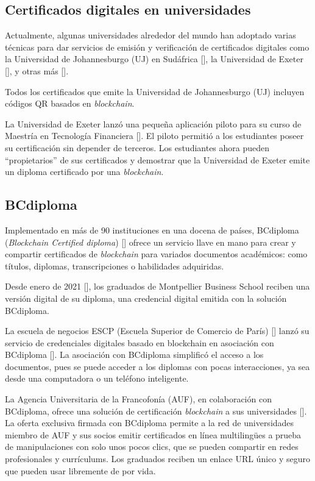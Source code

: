 \subsection{Certificados digitales en universidades}
Actualmente, algunas universidades alrededor del mundo han adoptado varias técnicas para dar servicios de emisión  y verificación de certificados digitales como la Universidad de Johannesburgo (UJ) en Sudáfrica [\cite{80}], la Universidad de Exeter [\cite{76}], y otras más [\cite{1}].

Todos los certificados que emite la Universidad de Johannesburgo (UJ) incluyen códigos QR basados en \textit{blockchain}. 

La Universidad de Exeter lanzó una pequeña aplicación piloto para su curso de Maestría en Tecnología Financiera [\cite{76}]. El piloto permitió a los estudiantes poseer su certificación sin depender de terceros. Los estudiantes ahora pueden ``propietarios'' de sus certificados y demostrar que la Universidad de Exeter emite un diploma certificado por una \textit{blockchain}.

\subsection{BCdiploma}
Implementado en más de 90 instituciones en una docena de países, BCdiploma (\textit{Blockchain Certified diploma}) [\cite{75}] ofrece un servicio llave en mano para crear y compartir certificados de \textit{blockchain} para variados documentos académicos: como títulos, diplomas, transcripciones o habilidades adquiridas.

Desde enero de 2021 [\cite{75, 78}], los graduados de Montpellier Business School reciben una versión digital de su diploma, una credencial digital emitida con la solución BCdiploma.

La escuela de negocios ESCP (Escuela Superior de Comercio de París) [\cite{74}] lanzó su servicio de credenciales digitales basado en blockchain en asociación con BCdiploma [\cite{75}]. La asociación con BCdiploma simplificó el acceso a los documentos, pues se puede acceder a los diplomas con pocas interacciones, ya sea desde una computadora o un teléfono inteligente.

La Agencia Universitaria de la Francofonía (AUF), en colaboración con BCdiploma, ofrece una solución de certificación \textit{blockchain} a sus universidades [\cite{77}]. La oferta exclusiva firmada con BCdiploma permite a la red de universidades miembro de AUF y sus socios emitir certificados en línea multilingües a prueba de manipulaciones con solo unos pocos clics, que se pueden compartir en redes profesionales y currículums. Los graduados reciben un enlace URL único y seguro que pueden usar libremente de por vida.


